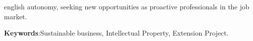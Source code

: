\begin{resumo}[Abstract]
\begin{otherlanguage*}{english}
autonomy, seeking new opportunities as proactive professionals in the job market.

 \textbf{Keywords}:Sustainable business, Intellectual Property, Extension Project.
 \end{otherlanguage*}
\end{resumo}